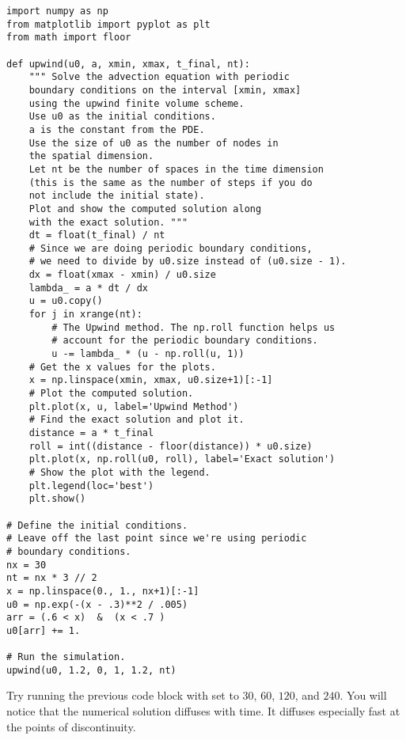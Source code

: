 \begin{lstlisting}
import numpy as np
from matplotlib import pyplot as plt
from math import floor

def upwind(u0, a, xmin, xmax, t_final, nt):
    """ Solve the advection equation with periodic
    boundary conditions on the interval [xmin, xmax]
    using the upwind finite volume scheme.
    Use u0 as the initial conditions.
    a is the constant from the PDE.
    Use the size of u0 as the number of nodes in
    the spatial dimension.
    Let nt be the number of spaces in the time dimension
    (this is the same as the number of steps if you do
    not include the initial state).
    Plot and show the computed solution along
    with the exact solution. """
    dt = float(t_final) / nt
    # Since we are doing periodic boundary conditions,
    # we need to divide by u0.size instead of (u0.size - 1).
    dx = float(xmax - xmin) / u0.size
    lambda_ = a * dt / dx
    u = u0.copy()
    for j in xrange(nt):
        # The Upwind method. The np.roll function helps us
        # account for the periodic boundary conditions.
        u -= lambda_ * (u - np.roll(u, 1))
    # Get the x values for the plots.
    x = np.linspace(xmin, xmax, u0.size+1)[:-1]
    # Plot the computed solution.
    plt.plot(x, u, label='Upwind Method')
    # Find the exact solution and plot it.
    distance = a * t_final
    roll = int((distance - floor(distance)) * u0.size)
    plt.plot(x, np.roll(u0, roll), label='Exact solution')
    # Show the plot with the legend.
    plt.legend(loc='best')
    plt.show()

# Define the initial conditions.
# Leave off the last point since we're using periodic
# boundary conditions.
nx = 30
nt = nx * 3 // 2
x = np.linspace(0., 1., nx+1)[:-1]
u0 = np.exp(-(x - .3)**2 / .005)
arr = (.6 < x)  &  (x < .7 )
u0[arr] += 1.

# Run the simulation.
upwind(u0, 1.2, 0, 1, 1.2, nt)
\end{lstlisting}

Try running the previous code block with  set to $30$, $60$, $120$, and $240$.
You will notice that the numerical solution diffuses with time.
It diffuses especially fast at the points of discontinuity.

